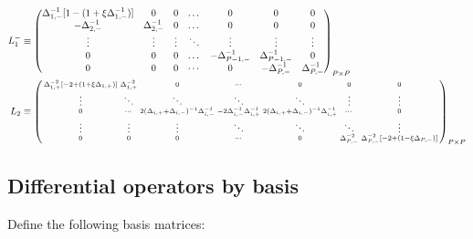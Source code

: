 \documentclass[11pt]{article}
\newenvironment{psmallmatrix}
{\left(\begin{smallmatrix}}
	{\end{smallmatrix}\right)}
\begin{document}
\begin{align}
L_1^{-} &\equiv \begin{pmatrix}
\Delta^{-1}_{1,-} [1 - (1 + \xi \Delta^{-1}_{1,-})] &0&0&\dots&0&0&0\\
-\Delta_{2,-}^{-1}&\Delta_{2,-}^{-1}&0&\dots&0&0&0\\
\vdots&\vdots&\vdots&\ddots&\vdots&\vdots&\vdots\\
0&0&0&\dots&-\Delta_{P-1,-}^{-1}&\Delta_{P-1,-}^{-1}&0\\
0&0&0&\cdots&0&-\Delta_{P,-}^{-1}&\Delta_{P,-}^{-1}
\end{pmatrix}_{P\times P}\label{eq:L-1} \\
L_2 &\equiv \begin{psmallmatrix}
\Delta_{1,+}^{-2}[-2 + (1+\xi \Delta_{1,+})] &\Delta_{1,+}^{-2}&0&\cdots&0&0&0 \\
\vdots&\ddots&\ddots&\ddots&\ddots&\vdots&\vdots\\
0&\cdots&2(\Delta_{i,+}+\Delta_{i,-})^{-1} \Delta_{i,-}^{-1} &-2\Delta_{i,-}^{-1} \Delta_{i,+}^{-1}  & 2 (\Delta_{i,+}+\Delta_{i,-})^{-1} \Delta_{i,+}^{-1}&\cdots&0 \\
\vdots&\vdots&\vdots&\ddots&\ddots&\ddots&\vdots\\
0&0&0&\cdots&0&\Delta_{P,-}^{-2}&\Delta_{P,-}^{-2} [-2 + (1- \xi\Delta_{P,-})]
\end{psmallmatrix}_{P\times P}\label{eq:L-2}
\end{align}

\subsection{Differential operators by basis}
Define the following basis matrices:
\end{document}
